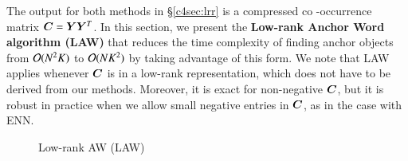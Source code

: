 The output for both methods in \S \ref{c4sec:lrr} is a compressed co
\hyp{}occurrence matrix $\bm{C} \mathrel{=} \bm{Y}\bm{Y}^T$. In this section, we present the 
\textbf{Low-rank Anchor Word algorithm (LAW)} that reduces the time complexity
of finding anchor objects from $\mathcal{O}(N^2K)$ to $\mathcal{O}(NK^2)$ by taking
advantage of this form. We note that LAW applies whenever $\bm{C}$ is in a low-rank
representation, which does not have to be derived from our methods. Moreover, it
is exact for non-negative $\bm{C}$, but it is robust in practice when we allow
small negative entries in $\bm{C}$, as in the case with ENN.

\begin{figure}[htbp]
	\begin{algorithm}[H]
		\DontPrintSemicolon
		\caption{Low-rank AW (LAW)}
	  \label{alg:law}      
	\end{algorithm}
	\vspace{2cm}
	\begin{algorithm}[H]
		\DontPrintSemicolon

\end{algorithm}
\end{figure}
